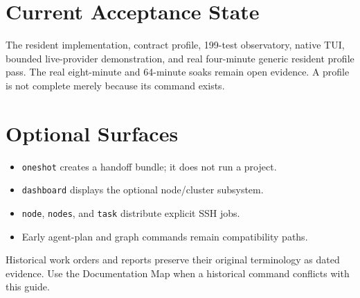 \documentclass[11pt,a4paper]{article}
\begin{document}
\section*{Current Acceptance State}

The resident implementation, contract profile, 199-test observatory, native
TUI, bounded live-provider demonstration, and real four-minute generic resident
profile pass. The real eight-minute and 64-minute soaks remain open evidence. A
profile is not complete merely because its command exists.

\section*{Optional Surfaces}

\begin{itemize}[nosep,leftmargin=1.4em]
  \item \texttt{oneshot} creates a handoff bundle; it does not run a project.
  \item \texttt{dashboard} displays the optional node/cluster subsystem.
  \item \texttt{node}, \texttt{nodes}, and \texttt{task} distribute explicit SSH jobs.
  \item Early agent-plan and graph commands remain compatibility paths.
\end{itemize}

Historical work orders and reports preserve their original terminology as
dated evidence. Use the Documentation Map when a historical command conflicts
with this guide.
\end{document}
